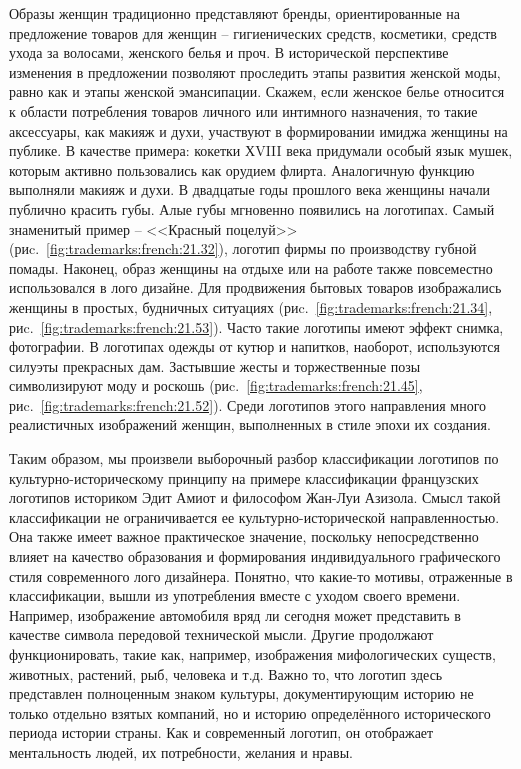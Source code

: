       Образы женщин традиционно представляют бренды, ориентированные
      на предложение товаров для женщин -- гигиенических средств, косметики, средств
      ухода за волосами, женского белья и проч. В исторической перспективе изменения в
      предложении позволяют проследить этапы развития женской моды, равно как и этапы
      женской эмансипации. Скажем, если женское белье относится к области потребления
      товаров личного или интимного назначения, то такие аксессуары, как макияж и
      духи, участвуют в формировании имиджа женщины на публике. В качестве примера:
      кокетки ХVIII века придумали особый язык мушек, которым активно пользовались как
      орудием флирта. Аналогичную функцию выполняли макияж и духи. В двадцатые годы
      прошлого века женщины начали публично красить губы. Алые губы мгновенно
      появились на логотипах. Самый знаменитый пример -- <<Красный поцелуй>> (риc.~\ref{fig:trademarks:french:21.32}),
      логотип фирмы по производству губной помады. Наконец, образ женщины на отдыхе
      или на работе также повсеместно использовался в лого дизайне. Для продвижения
      бытовых товаров изображались женщины в простых, будничных ситуациях (риc.~\ref{fig:trademarks:french:21.34},
      риc.~\ref{fig:trademarks:french:21.53}). Часто такие логотипы имеют эффект снимка, фотографии. В логотипах одежды
      от кутюр и напитков, наоборот, используются силуэты прекрасных дам. Застывшие
      жесты и торжественные позы символизируют моду и роскошь
      (риc.~\ref{fig:trademarks:french:21.45}, риc.~\ref{fig:trademarks:french:21.52}). Среди
      логотипов этого направления много реалистичных изображений женщин, выполненных в
      стиле эпохи их создания.

Таким образом, мы произвели выборочный разбор классификации логотипов по
культурно-историческому принципу на примере классификации французских
логотипов историком Эдит Амиот и философом Жан-Луи Азизола. Смысл такой
классификации не ограничивается ее культурно-исторической направленностью.
Она также имеет важное практическое значение, поскольку непосредственно
влияет на качество образования и формирования индивидуального графического
стиля современного лого дизайнера. Понятно, что какие-то мотивы, отраженные
в классификации, вышли из употребления вместе с уходом своего времени.
Например, изображение автомобиля вряд ли сегодня может представить в качестве
символа передовой технической мысли. Другие продолжают функционировать,
такие как, например, изображения мифологических существ, животных, растений,
рыб, человека и т.д. Важно то, что логотип здесь представлен полноценным
знаком культуры, документирующим историю не только отдельно взятых компаний,
но и историю определённого исторического периода истории страны. Как и
современный логотип, он отображает ментальность людей, их потребности,
желания и нравы.

